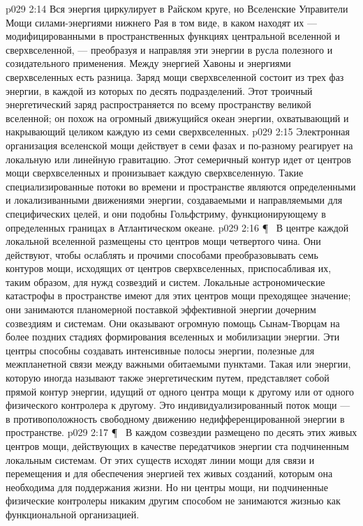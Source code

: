 \vs p029 2:14 Вся энергия циркулирует в Райском круге, но Вселенские Управители Мощи  силами\hyp{}энергиями нижнего Рая в том виде, в каком находят их --- модифицированными в пространственных функциях центральной вселенной и сверхвселенной, --- преобразуя и направляя эти энергии в русла полезного и созидательного применения. Между энергией Хавоны и энергиями сверхвселенных есть разница. Заряд мощи сверхвселенной состоит из трех фаз энергии, в каждой из которых по десять подразделений. Этот троичный энергетический заряд распространяется по всему пространству великой вселенной; он похож на огромный движущийся океан энергии, охватывающий и накрывающий целиком каждую из семи сверхвселенных.
\vs p029 2:15 Электронная организация вселенской мощи действует в семи фазах и по\hyp{}разному реагирует на локальную или линейную гравитацию. Этот семеричный контур идет от центров мощи сверхвселенных и пронизывает каждую сверхвселенную. Такие специализированные потоки во времени и пространстве являются определенными и локализиванными движениями энергии, создаваемыми и направляемыми для специфических целей, и они подобны Гольфстриму, функционирующему в определенных границах в Атлантическом океане.
\vs p029 2:16 \P\ \bibnobreakspace {} В центре каждой локальной вселенной размещены сто центров мощи четвертого чина. Они действуют, чтобы ослаблять и прочими способами преобразовывать семь контуров мощи, исходящих от центров сверхвселенных, приспосабливая их, таким образом, для нужд созвездий и систем. Локальные астрономические катастрофы в пространстве имеют для этих центров мощи преходящее значение; они занимаются планомерной поставкой эффективной энергии дочерним созвездиям и системам. Они оказывают огромную помощь Сынам\hyp{}Творцам на более поздних стадиях формирования вселенных и мобилизации энергии. Эти центры способны создавать интенсивные полосы энергии, полезные для межпланетной связи между важными обитаемыми пунктами. Такая  или  энергии, которую иногда называют также энергетическим путем, представляет собой прямой контур энергии, идущий от одного центра мощи к другому или от одного физического контролера к другому. Это индивидуализированный поток мощи --- в противоположность свободному движению недифференцированной энергии в пространстве.
\vs p029 2:17 \P\ \bibnobreakspace {} В каждом созвездии размещено по десять этих живых центров мощи, действующих в качестве передатчиков энергии ста подчиненным локальным системам. От этих существ исходят линии мощи для связи и перемещения и для обеспечения энергией тех живых созданий, которым она необходима для поддержания жизни. Но ни центры мощи, ни подчиненные физические контролеры никаким другим способом не занимаются жизнью как функциональной организацией.
